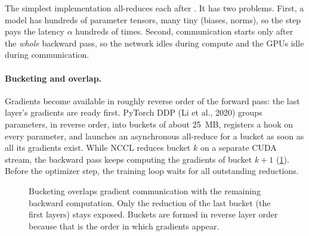 The simplest implementation all-reduces each  after . It has two
problems. First, a model has hundreds of parameter tensors, many tiny (biases, norms), so the
step pays the latency $\alpha$ hundreds of times. Second, communication starts only after the
\emph{whole} backward pass, so the network idles during compute and the GPUs idle during
communication.

\paragraph{Bucketing and overlap.} Gradients become available in roughly reverse order of the
forward pass: the last layer's gradients are ready first. PyTorch DDP (Li et al., 2020) groups
parameters, in reverse order, into buckets of about \SI{25}{MB}, registers a hook on every
parameter, and launches an asynchronous all-reduce for a bucket as soon as all its gradients
exist. While NCCL reduces bucket $k$ on a separate CUDA stream, the backward pass keeps
computing the gradients of bucket $k+1$ (\cref{fig:dist:overlap}). Before the optimizer step,
the training loop waits for all outstanding reductions.

\begin{figure}[t]
\centering
{}
\caption{Bucketing overlaps gradient communication with the remaining backward computation.
Only the reduction of the last bucket (the first layers) stays exposed. Buckets are formed in
reverse layer order because that is the order in which gradients appear.}
\label{fig:dist:overlap}
\end{figure}


